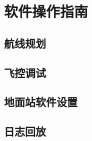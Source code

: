 \section{软件操作指南}
\subsection{航线规划}

\subsection{飞控调试}

\subsection{地面站软件设置}

\subsection{日志回放}

\clearpage
\endinput
















